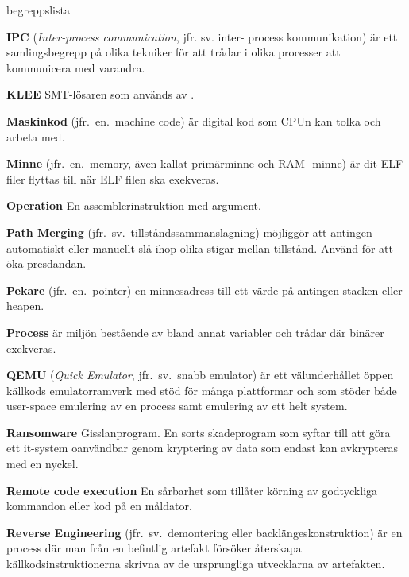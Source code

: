 \begin{labeling}{begreppslista}
    \item [\textbf{IPC}] (\emph{Inter-process communication}, jfr. sv. inter-
          process kommunikation) är ett samlingsbegrepp på olika tekniker för att
    trådar i olika processer att kommunicera med varandra.

    \item [\textbf{KLEE}] SMT-lösaren som används av \stoe{}.

    \item [\textbf{Maskinkod}] (jfr.\ en.\ machine code) är digital kod som CPUn
    kan tolka och arbeta med.

    \item [\textbf{Minne}] (jfr.\ en.\ memory, även kallat primärminne och RAM-
          minne) är dit ELF filer flyttas till när ELF filen ska exekveras.

    \item [\textbf{Operation}] En assemblerinstruktion med argument.

    \item [\textbf{Path Merging}] (jfr.\ sv.\ tillståndssammanslagning) möjliggör
    att antingen automatiskt eller manuellt slå ihop olika stigar mellan
    tillstånd.  Använd för att öka presdandan.

    \item [\textbf{Pekare}] (jfr.\ en.\ pointer) en minnesadress till ett värde på
    antingen stacken eller heapen.

    \item [\textbf{Process}] är miljön bestående av bland annat variabler och
    trådar där binärer exekveras.

    \item [\textbf{QEMU}] (\emph{Quick Emulator}, jfr.\ sv.\ snabb emulator) är
    ett välunderhållet öppen källkods emulatorramverk med stöd för många
    plattformar och som stöder både user-space emulering av en process samt
    emulering av ett helt system.

    \item [\textbf{Ransomware}] Gisslanprogram. En sorts skadeprogram som syftar
    till att göra ett it-system oanvändbar genom kryptering av data som endast
    kan avkrypteras med en nyckel.

    \item [\textbf{Remote code execution}] En sårbarhet som tillåter körning av
    godtyckliga kommandon eller kod på en måldator.

    \item [\textbf{Reverse Engineering}] (jfr.\ sv.\ demontering eller
          backlängeskonstruktion) är en process där man från en befintlig artefakt
    försöker återskapa källkodsinstruktionerna skrivna av de ursprungliga
    utvecklarna av artefakten.


\end{labeling}

